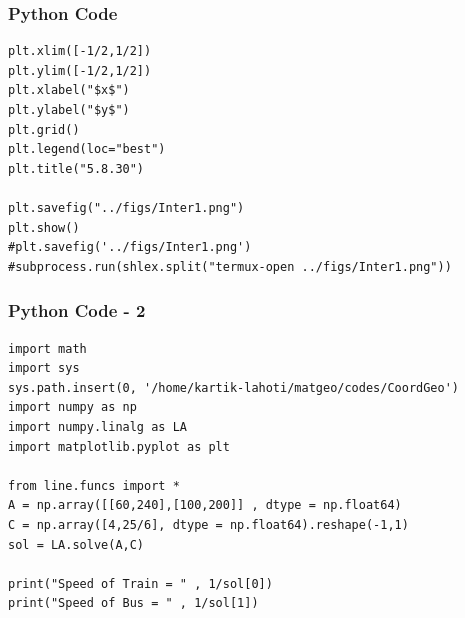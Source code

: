 \documentclass{beamer}
\begin{document}
\begin{frame}[fragile]
    \frametitle{Python Code}
    \begin{lstlisting}
plt.xlim([-1/2,1/2])
plt.ylim([-1/2,1/2])
plt.xlabel("$x$")
plt.ylabel("$y$")
plt.grid()
plt.legend(loc="best")
plt.title("5.8.30")

plt.savefig("../figs/Inter1.png")
plt.show()
#plt.savefig('../figs/Inter1.png')
#subprocess.run(shlex.split("termux-open ../figs/Inter1.png"))

\end{lstlisting}
\end{frame}
\begin{frame}[fragile]
    \frametitle{Python Code - 2 }
    \begin{lstlisting}
import math
import sys 
sys.path.insert(0, '/home/kartik-lahoti/matgeo/codes/CoordGeo')
import numpy as np
import numpy.linalg as LA
import matplotlib.pyplot as plt

from line.funcs import *
A = np.array([[60,240],[100,200]] , dtype = np.float64)
C = np.array([4,25/6], dtype = np.float64).reshape(-1,1)
sol = LA.solve(A,C)

print("Speed of Train = " , 1/sol[0])
print("Speed of Bus = " , 1/sol[1])

\end{lstlisting}
\end{frame}
\end{document}
